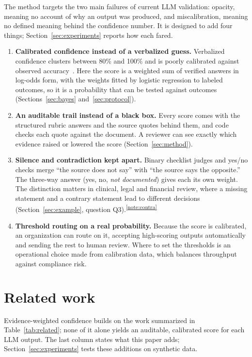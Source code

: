 \documentclass[10pt,letterpaper]{article}
\newcommand{\nd}{\textit{not documented}}
\newcommand{\tnote}[1]{\textsuperscript{\hyperref[note:#1]{\ref*{note:#1}}}}
\begin{document}
The method targets the two main failures of current LLM validation: opacity, meaning no account of why an output was produced, and miscalibration, meaning no defined meaning behind the confidence number. It is designed to add four things; Section~\ref{sec:experiments} reports how each fared.
\begin{enumerate}
  \item \textbf{Calibrated confidence instead of a verbalized guess.} Verbalized confidence clusters between 80\% and 100\% and is poorly calibrated against observed accuracy~\cite{xiong}. Here the score is a weighted sum of verified answers in log-odds form, with the weights fitted by logistic regression to labeled outcomes, so it is a probability that can be tested against outcomes (Sections~\ref{sec:bayes} and~\ref{sec:protocol}).
  \item \textbf{An auditable trail instead of a black box.} Every score comes with the structured rubric answers and the source quotes behind them, and code checks each quote against the document. A reviewer can see exactly which evidence raised or lowered the score (Section~\ref{sec:method}).
  \item \textbf{Silence and contradiction kept apart.} Binary checklist judges and yes/no checks merge ``the source does not say'' with ``the source says the opposite.'' The three-way answer (yes, no, \nd) gives each its own weight. The distinction matters in clinical, legal and financial review, where a missing statement and a contrary statement lead to different decisions (Section~\ref{sec:example}, question Q3).\tnote{contra}
  \item \textbf{Threshold routing on a real probability.} Because the score is calibrated, an organization can route on it, accepting high-scoring outputs automatically and sending the rest to human review. Where to set the thresholds is an operational choice made from calibration data, which balances throughput against compliance risk.
\end{enumerate}

\section{Related work}

Evidence-weighted confidence builds on the work summarized in Table~\ref{tab:related}; none of it alone yields an auditable, calibrated score for each LLM output. The last column states what this paper adds; Section~\ref{sec:experiments} tests these additions on synthetic data.
\end{document}
